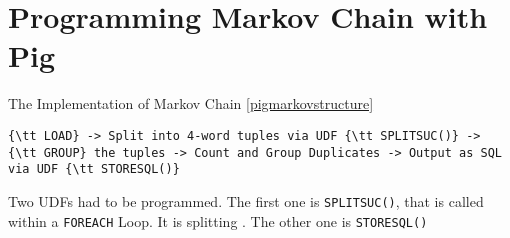 \section{Programming Markov Chain with Pig}                                              

The Implementation of Markov Chain \ref{pigmarkovstructure}   
                         
\begin{lstlisting}[language=pig,caption=Pig Latin Script Structure ,label=pigmarkovstructure]    
{\tt LOAD} -> Split into 4-word tuples via UDF {\tt SPLITSUC()} -> {\tt GROUP} the tuples -> Count and Group Duplicates -> Output as SQL via UDF {\tt STORESQL()}
\end{lstlisting}

Two UDFs had to be programmed. 
The first one is {\tt SPLITSUC()}, that is called within a {\tt FOREACH} Loop. It is splitting .
The other one is {\tt STORESQL()} 